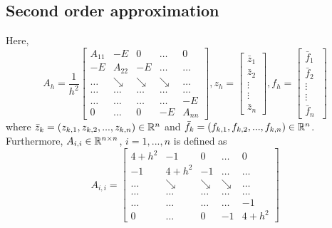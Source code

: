\documentclass[11pt,a4paper,twoside]{article}
\begin{document}
\subsection{Second order approximation}

Here,
\[
A_h = \frac{1}{h^2}
\begin{bmatrix}
    A_{11}       & -E          &  0              & \dots & 0 \\
    -E               & A_{22}  & -E              & \dots & \dots  \\
      \dots         & \searrow     & \searrow  & \searrow  & \dots  \\
      \dots         & \dots     & \dots         & \dots   &    \dots  \\
      \dots         & \dots    & \dots         & \dots & -E  \\
     0                 & \dots   &  0               & -E    & A_{nn}
\end{bmatrix}
,
z_h = 
\begin{bmatrix}
    \bar z_{1} \\
    \bar z_{2}  \\
    \vdots  \\
    \vdots  \\
    \bar z_{n}
\end{bmatrix}
,
f_h = 
\begin{bmatrix}
    \bar f_{1} \\
    \bar f_{2}  \\
    \vdots  \\
    \vdots  \\
    \bar f_{n}\
\end{bmatrix}
\]
where $\bar z_k = (z_{k,1}, z_{k,2}, ..., z_{k,n})\in \mathbb{R}^{n}$ and $\bar f_k = (f_{k,1}, f_{k,2}, ..., f_{k,n})\in \mathbb{R}^{n}$. Furthermore, $A_{i,i} \in \mathbb{R}^{n \times n}$, $i = 1, ..., n$ is defined as
\[
A_{i,i} = 
\begin{bmatrix}
    4+h^2       & -1          &  0              & \dots & 0 \\
    -1               & 4+h^2  & -1              & \dots & \dots  \\
      \dots         & \searrow     & \searrow  & \searrow  & \dots  \\
      \dots         & \dots     & \dots         & \dots   &    \dots  \\
      \dots         & \dots    & \dots         & \dots & -1  \\
     0                 & \dots   &  0               & -1    & 4+h^2
\end{bmatrix}
\]
\end{document}

